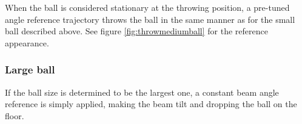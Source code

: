When the ball is considered stationary at the throwing position, a pre-tuned angle reference trajectory throws the ball in the same manner as for the small ball described above. See figure \ref{fig:throwmediumball} for the reference appearance.

\subsubsection{Large ball}\label{sec:large_ball_delivery}
If the ball size is determined to be the largest one, a constant beam angle reference is simply applied, making the beam tilt and dropping the ball on the floor.









